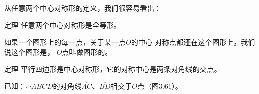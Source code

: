 \begin{figure}
    \begin{minipage}[t]{0.48\linewidth}
    \centering
    \begin{tikzpicture}
    \end{tikzpicture}
    \caption{}
    \end{minipage}
    \begin{minipage}[t]{0.48\linewidth}
    \centering
    \begin{tikzpicture}[>=latex, scale=1]
    \end{tikzpicture}
    \caption{}
    \end{minipage}
    \end{figure}

从任意两个中心对称形的定义，我们很容易看出：

\begin{Theorem}{定理}
   任意两个中心对称形是全等形。 
\end{Theorem}

\begin{Definition} 
如果一个图形上的每一点，关于某一点$O$的中心
对称点都还在这个图形上，我们说这个图形是，
$O$点叫做图形的。 
\end{Definition}


\begin{Theorem}{定理} 
平行四边形是中心对称形，它的对称中心是两条对角线的交点。
\end{Theorem}

已知：$\parallelogram ABCD$的对角线$\overline{AC}$、$\overline{BD}$相交于$O$点（图3.61）。


